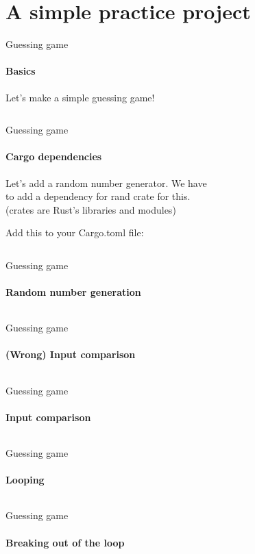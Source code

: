 \documentclass[usenames,dvipsnames,10pt,aspectratio=169]{beamer}
\begin{document}
\section{A simple practice project}

\begin{frame}{Guessing game}
	\framesubtitle{Basics}
\textcolor{ucuyellow}{Let's make a simple guessing game!}
	\vspace{0.4cm}
	\inputminted[fontsize=\normalsize]{rust}{code/guess1.rs}
	\vspace{0.4cm}
\end{frame}

\begin{frame}{Guessing game}
	\framesubtitle{Cargo dependencies}
	\Large
	Let's add a random number generator. We have\\
	to add a dependency for \textcolor{ucuyellow}{rand} crate for this.\\
	(crates are Rust's libraries and modules)
	\vspace{0.5cm}

	Add this to your Cargo.toml file:
	\inputminted[fontsize=\Large]{toml}{code/toml1.toml}
\end{frame}

\begin{frame}{Guessing game}
	\framesubtitle{Random number generation}
	\inputminted[fontsize=\footnotesize]{rust}{code/guess2.rs}
\end{frame}

\begin{frame}{Guessing game}
	\framesubtitle{(Wrong) Input comparison}
	\inputminted[fontsize=\normalsize]{rust}{code/guess3.rs}
\end{frame}

\begin{frame}{Guessing game}
	\framesubtitle{Input comparison}
	\inputminted[fontsize=\normalsize]{rust}{code/guess4.rs}
\end{frame}


\begin{frame}{Guessing game}
	\framesubtitle{Looping}
	\inputminted[fontsize=\normalsize]{rust}{code/guess5.rs}
\end{frame}

\begin{frame}{Guessing game}
	\framesubtitle{Breaking out of the loop}
	\inputminted[fontsize=\large]{rust}{code/guess6.rs}
\end{frame}
\end{document}
